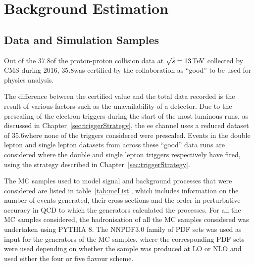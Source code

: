 \chapter{Background Estimation}\label{chapter:bkg}
%
%
%
%

\section{Data and Simulation Samples}\label{sec:samples}
Out of the 37.8\fbinv of the proton-proton collision data at $\sqrt{s} = 13\,\text{Te\hspace{-.08em}V}$ collected by CMS during 2016, 35.8\fbinv was certified by the collaboration as ``good'' to be used for physics analysis.

The difference between the certified value and the total data recorded is the result of various factors such as the unavailability of a detector.
Due to the prescaling of the electron triggers during the start of the most luminous runs, as discussed in Chapter~\ref{sec:triggerStrategy}, the ee channel uses a reduced dataset of 35.6\fbinv where none of the triggers considered were prescaled.
Events in the double lepton and single lepton datasets from across these ``good'' data runs are considered where the double and single lepton triggers respectively have fired, using the strategy described in Chapter~\ref{sec:triggerStrategy}.

The MC samples used to model signal and background processes that were considered are listed in table~\ref{tab:mcList}, which includes information on the number of events generated, their cross sections and the order in perturbative accuracy in QCD to which the generators calculated the processes.
For all the MC samples considered, the hadronisation of all the MC samples considered was undertaken using PYTHIA 8.
The NNPDF3.0 family of PDF sets was used as input for the generators of the MC samples, where the corresponding PDF sets were used depending on whether the sample was produced at LO or NLO and used either the four or five flavour scheme.

